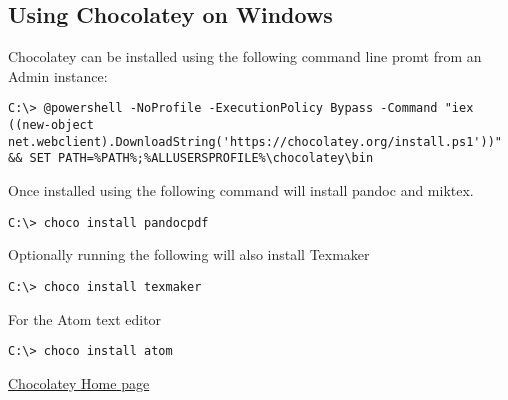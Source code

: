 \subsection{Using Chocolatey on
Windows}\label{using-chocolatey-on-windows}

Chocolatey can be installed using the following command line promt from
an Admin instance:

\begin{verbatim}
C:\> @powershell -NoProfile -ExecutionPolicy Bypass -Command "iex ((new-object net.webclient).DownloadString('https://chocolatey.org/install.ps1'))" && SET PATH=%PATH%;%ALLUSERSPROFILE%\chocolatey\bin
\end{verbatim}

Once installed using the following command will install pandoc and
miktex.

\begin{verbatim}
C:\> choco install pandocpdf
\end{verbatim}

Optionally running the following will also install Texmaker

\begin{verbatim}
C:\> choco install texmaker
\end{verbatim}

For the Atom text editor

\begin{verbatim}
C:\> choco install atom
\end{verbatim}

\href{https://chocolatey.org/}{Chocolatey Home page}
